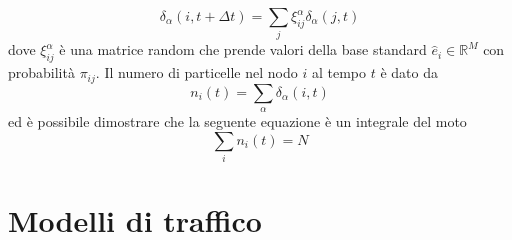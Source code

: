 \documentclass[../main.tex]{subfiles}
\begin{document}
\begin{equation}
    \delta_\alpha(i,t+\Delta t)=\sum_j\xi_{ij}^\alpha\delta_\alpha(j,t)
\end{equation}
dove $\xi_{ij}^\alpha$ \`e una matrice random che prende valori della base standard $\widehat{e}_i\in \mathbb{R}^M$ con probabilità $\pi_{ij}$.
Il numero di particelle nel nodo $i$ al tempo $t$ \`e dato da
\begin{equation}
    n_i(t)=\sum_\alpha\delta_\alpha(i,t)
\end{equation}
ed \`e possibile dimostrare \cite{RandomWalks} che la seguente equazione \`e un integrale del moto
\begin{equation}
    \sum_in_i(t)=N
\end{equation}

\section{Modelli di traffico}
\end{document}
